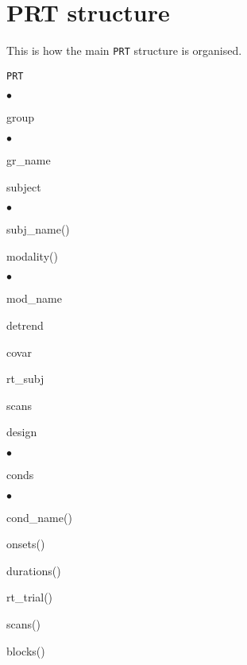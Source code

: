 \chapter{PRT structure}
\label{sec:PRTstruct}
\minitoc

This is how the main {\tt PRT} structure is organised.

{\tt PRT}
\begin{list}{$\bullet$}
    {\setlength{\labelsep}{.2cm}\setlength{\itemindent}{0cm}\setlength{\leftmargin}{0.2cm}}
\item group
    \begin{list}{$\bullet$}
        {\setlength{\labelsep}{.2cm}\setlength{\itemindent}{0cm}\setlength{\leftmargin}{0.7cm}}
    \item gr\_name
    \item subject
        \begin{list}{$\bullet$}
            {\setlength{\labelsep}{.2cm}\setlength{\itemindent}{0cm}\setlength{\leftmargin}{1.2cm}}
        \item subj\_name()
        \item modality()
            \begin{list}{$\bullet$}
                {\setlength{\labelsep}{.2cm}\setlength{\itemindent}{0cm}\setlength{\leftmargin}{1.7cm}}
            \item mod\_name
            \item detrend
            \item covar
            \item rt\_subj
            \item scans
            \item design
                \begin{list}{$\bullet$}
                    {\setlength{\labelsep}{.2cm}\setlength{\itemindent}{0cm}\setlength{\leftmargin}{2.2cm}}
                \item conds
                    \begin{list}{$\bullet$}
                        {\setlength{\labelsep}{.2cm}\setlength{\itemindent}{0cm}\setlength{\leftmargin}{2.7cm}}
                    \item cond\_name()
                    \item onsets()
                    \item durations()
                    \item rt\_trial()
                    \item scans()
                    \item blocks()

\end{list}
\end{list}
\end{list}
\end{list}
\end{list}
\end{list}
